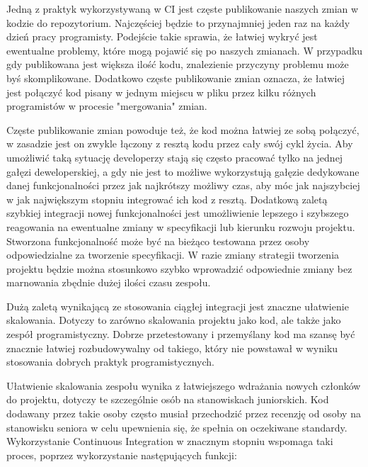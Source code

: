 Jedną z praktyk wykorzystywaną w CI jest częste publikowanie naszych zmian w kodzie do repozytorium. Najczęściej będzie to przynajmniej jeden raz na każdy dzień pracy programisty. Podejście takie sprawia, że łatwiej wykryć jest ewentualne problemy, które mogą pojawić się po naszych zmianach. W przypadku gdy publikowana jest większa ilość kodu, znalezienie przyczyny problemu może byś skomplikowane. Dodatkowo częste publikowanie zmian oznacza, że łatwiej jest połączyć kod pisany w jednym miejscu w pliku przez kilku różnych programistów w procesie "mergowania" zmian. 

Częste publikowanie zmian powoduje też, że kod można łatwiej ze sobą połączyć, w zasadzie jest on zwykle łączony z resztą kodu przez cały swój cykl życia. Aby umożliwić taką sytuację developerzy stają się często pracować tylko na jednej gałęzi deweloperskiej, a gdy nie jest to możliwe wykorzystują gałęzie dedykowane danej funkcjonalności przez jak najkrótszy możliwy czas, aby móc jak najszybciej w jak największym stopniu integrować ich kod z resztą. Dodatkową zaletą szybkiej integracji nowej funkcjonalności jest umożliwienie lepszego i szybszego reagowania na ewentualne zmiany w specyfikacji lub kierunku rozwoju projektu. Stworzona funkcjonalność może być na bieżąco testowana przez osoby odpowiedzialne za tworzenie specyfikacji. W razie zmiany strategii tworzenia projektu będzie można stosunkowo szybko wprowadzić odpowiednie zmiany bez marnowania zbędnie dużej ilości czasu zespołu.

Dużą zaletą wynikającą ze stosowania ciągłej integracji jest znaczne ułatwienie skalowania. Dotyczy to zarówno skalowania projektu jako kod, ale także jako zespół programistyczny. Dobrze przetestowany i przemyślany kod ma szansę być znacznie łatwiej rozbudowywalny od takiego, który nie powstawał w wyniku stosowania dobrych praktyk programistycznych. 

Ułatwienie skalowania zespołu wynika z łatwiejszego wdrażania nowych członków do projektu, dotyczy te szczególnie osób na stanowiskach juniorskich. Kod dodawany przez takie osoby często musiał przechodzić przez recenzję od osoby na stanowisku seniora w celu upewnienia się, że spełnia on oczekiwane standardy. Wykorzystanie Continuous Integration w znacznym stopniu wspomaga taki proces, poprzez wykorzystanie następujących funkcji: 

